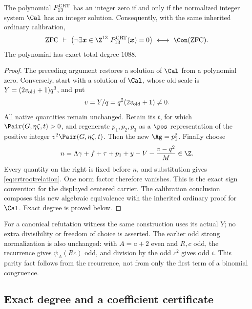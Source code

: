 \begin{theorem}\label{thm:crt1088}
The polynomial \(P_{13}^{\rm CRT}\) has an integer zero if and only
if the normalized integer system \(\Cal\) has an integer solution.
Consequently, with the same inherited ordinary calibration,
\[
\mathrm{ZFC}\ \vdash\
\left(\neg\exists\boldsymbol{x}\in\Z^{13}
\ P_{13}^{\rm CRT}(\boldsymbol{x})=0\right)
\ \longleftrightarrow\ \Con(\mathrm{ZFC}).
\]
The polynomial has exact total degree \(1088\).
\end{theorem}
\begin{proof}
The preceding argument restores a solution of \(\Cal\) from a
polynomial zero. Conversely, start with a solution of \(\Cal\),
whose old scale is \(Y=(2v_{\rm old}+1)q^3\), and put
\[
v=Y/q=q^2(2v_{\rm old}+1)\ne0.
\]
All native quantities remain unchanged. Retain its \(t\), for which
\(\Pair(G,\eta\zeta,t)>0\), and regenerate \(p_1,p_2,p_3\)
as a \(\pos\) representation of the positive integer
\(v^2\Pair(G,\eta\zeta,t)\). Then the new \(\Ag=p_1^2\).
Finally choose
\begin{equation}
n=\Lambda\gamma+f+\tau+p_1+y-V-\frac{v-q^2}{M}\in\Z.
\label{eq:crtchoose-n}
\end{equation}
Every quantity on the right is fixed before \(n\), and substitution
gives \eqref{eq:crtrootrelation}. One norm factor therefore vanishes.
This is the exact sign convention for the displayed centered carrier.
The calibration conclusion composes this new algebraic equivalence
with the inherited ordinary proof for \(\Cal\). Exact degree is
proved below.
\end{proof}

For a canonical refutation witness the same construction uses its
actual \(Y\); no extra divisibility or freedom of choice is asserted.
The earlier odd strong normalization is also unchanged: with
\(A=a+2\) even and \(R,c\) odd, the recurrence gives
\(\psi_A(Rc)\) odd, and division by the odd \(c^2\) gives odd
\(i\). This parity fact follows from the recurrence, not from only
the first term of a binomial congruence.

\subsection{Exact degree and a coefficient certificate}

